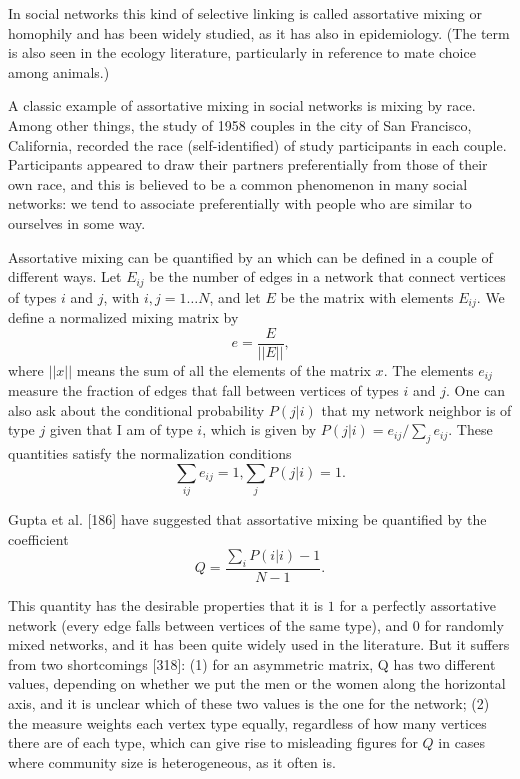       In social networks this kind of selective linking is called assortative mixing or homophily and has been widely studied, as it has also in epidemiology. (The term  is also seen in the ecology literature, particularly in reference to mate choice among animals.) 
      
      A classic example of assortative mixing in social networks is mixing by race. Among other things, the study of 1958 couples in the city of San Francisco, California, recorded the race (self-identified) of study participants in each couple. Participants appeared to draw their partners preferentially from those of their own race, and this is believed to be a common phenomenon in many social networks: we tend to associate preferentially with people who are similar to ourselves in some way.

      Assortative mixing can be quantified by an  which can be defined in a couple of different ways. Let $E_{ij}$ be the number of edges in a network that connect vertices of types $i$ and $j$, with $i,j = 1 \ldots N$, and let $E$ be the matrix with elements $E_{ij}$. We define a normalized mixing matrix by
      \begin{equation}
        e = \frac{E}{||E||}\mbox{,}
      \end{equation}
      where $||x||$ means the sum of all the elements of the matrix $x$. The elements $e_{ij}$ measure the fraction of edges that fall between vertices of types $i$ and $j$. One can also ask about the conditional probability $P(j|i)$ that my network neighbor is of type $j$ given that I am of type $i$, which is given by $P (j|i) = e_{ij} / \sum_j e_{ij}$. These quantities satisfy the normalization conditions
      \begin{equation}
        \sum_{ij} e_{ij} = 1\mbox{,} \sum_j P(j|i) = 1\mbox{.}
      \end{equation}
      
      Gupta et al. [186] have suggested that assortative mixing be quantified by the coefficient
      \begin{equation}
        Q = \frac{\sum_i P(i|i) - 1}{N - 1}\mbox{.}
      \end{equation}

      This quantity has the desirable properties that it is $1$ for a perfectly assortative network (every edge falls between vertices of the same type), and $0$ for randomly mixed networks, and it has been quite widely used in the literature. But it suffers from two shortcomings [318]: (1) for an asymmetric matrix, Q has two different values, depending on whether we put the men or the women along the horizontal axis, and it is unclear which of these two values is the  one for the network; (2) the measure weights each vertex type equally, regardless of how many vertices there are of each type, which can give rise to misleading figures for $Q$ in cases where community size is heterogeneous, as it often is.
      
